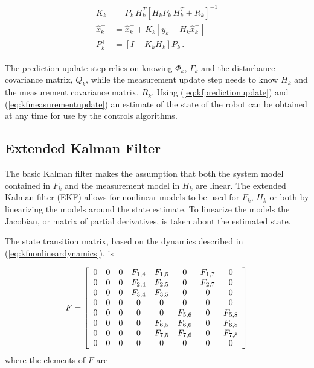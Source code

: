 \begin{align}
\label{eq:kfmeasurementupdate}
\begin{split}
K_k &= P_k^-H_k^T\left[H_kP_k^-H_k^T + R_k\right]^{-1} \\
\hat{x}_k^+ &= \hat{x}_k^- + K_k\left[y_k - H_k\hat{x}_k^-\right] \\
P_k^+ &= \left[I - K_kH_k\right]P_k^-.
\end{split}
\end{align}

The prediction update step relies on knowing $\Phi_k$, $\Gamma_k$ and the disturbance covariance matrix, $Q_k$, while the measurement update step needs to know $H_k$ and the measurement covariance matrix, $R_k$. Using (\ref{eq:kfpredictionupdate}) and (\ref{eq:kfmeasurementupdate}) an estimate of the state of the robot can be obtained at any time for use by the controls algorithms.

\subsection{Extended Kalman Filter}
\label{sec:extendedkf}
The basic Kalman filter makes the assumption that both the system model contained in $F_k$ and the measurement model in $H_k$ are linear. The extended Kalman filter (EKF) allows for nonlinear models to be used for $F_k$, $H_k$ or both by linearizing the models around the state estimate. To linearize the models the Jacobian, or matrix of partial derivatives, is taken about the estimated state.

The state transition matrix, based on the dynamics described in (\ref{eq:kfnonlineardynamics}), is

\begin{align}
\label{eq:kfF}
F = \left[\begin{array}{c c c c c c c c}
0 & 0 & 0 & F_{1,4} & F_{1,5} & 0 & F_{1,7} & 0 \\
0 & 0 & 0 & F_{2,4} & F_{2,5} & 0 & F_{2,7} & 0 \\
0 & 0 & 0 & F_{3,4} & F_{3,5} & 0 & 0 & 0 \\
0 & 0 & 0 & 0 & 0 & 0 & 0 & 0 \\
0 & 0 & 0 & 0 & 0 & F_{5,6} & 0 & F_{5,8} \\
0 & 0 & 0 & 0 & F_{6,5} & F_{6,6} & 0 & F_{6,8} \\
0 & 0 & 0 & 0 & F_{7,5} & F_{7,6} & 0 & F_{7,8} \\
0 & 0 & 0 & 0 & 0 & 0 & 0 & 0
\end{array}\right]
\end{align}
where the elements of $F$ are

